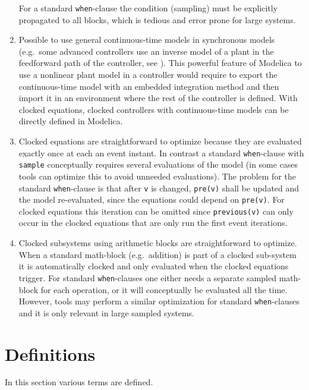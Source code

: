 \begin{nonnormative}
\begin{enumerate}
  For a standard \lstinline!when!-clause the condition (sampling) must be explicitly
  propagated to all blocks, which is tedious and error prone for large systems.
\item
  Possible to use general continuous-time models in synchronous models (e.g.\ some advanced controllers use an inverse model of a plant in the feedforward path of the controller, see \textcite{ThummelEtAl2005InverseModels}).
  This powerful feature of Modelica to use a nonlinear plant model in a controller would require to export the continuous-time model with an embedded integration method and then import it in an environment where the rest of the controller is defined.
  With clocked equations, clocked controllers with continuous-time models can be directly defined in Modelica.
\item
  Clocked equations are straightforward to optimize because they are
  evaluated exactly once at each an event instant.
  In contrast a standard \lstinline!when!-clause with \lstinline!sample! conceptually
  requires several evaluations of the model (in some cases tools
  can optimize this to avoid unneeded evaluations).
  The problem for the standard \lstinline!when!-clause is that after \lstinline!v!
  is changed, \lstinline!pre(v)! shall be updated and the model re-evaluated,
  since the equations could depend on \lstinline!pre(v)!.
  For clocked equations this iteration can be omitted
  since \lstinline!previous(v)! can only occur in the clocked equations
  that are only run the first event iterations.
\item
  Clocked subsystems using arithmetic blocks are straightforward to optimize.
  When a standard math-block (e.g.\ addition) is part of a clocked sub-system it is automatically
  clocked and only evaluated when the clocked equations trigger.
  For standard \lstinline!when!-clauses one either needs a separate sampled math-block for each operation, or
  it will conceptually be evaluated all the time.
  However, tools may perform a similar optimization for standard \lstinline!when!-clauses
  and it is only relevant in large sampled systems.
\end{enumerate}
\end{nonnormative}

\section{Definitions}\label{definitions}

In this section various terms are defined.

